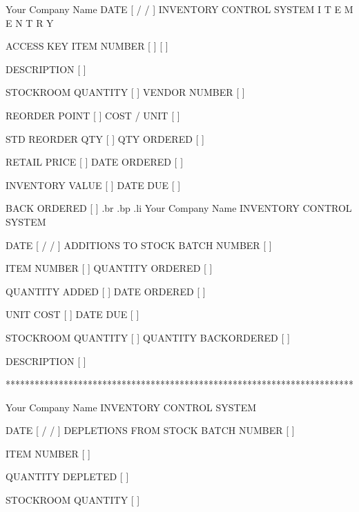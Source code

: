 			 Your Company Name
  DATE [  /  /	]      INVENTORY CONTROL SYSTEM
			 I T E M   E N T R Y

  ACCESS KEY					    ITEM NUMBER
[	    ]					    [	      ]

DESCRIPTION	  [				 ]

STOCKROOM QUANTITY [	   ]		VENDOR NUMBER [     ]

REORDER POINT	   [	   ]		COST / UNIT   [       ]

STD REORDER QTY    [	   ]		QTY ORDERED [	     ]

RETAIL PRICE	   [	       ]	DATE ORDERED  [        ]

INVENTORY VALUE    [		 ]	DATE DUE      [        ]

					BACK ORDERED  [       ]
.br
.bp
.li
			Your Company Name
		     INVENTORY CONTROL SYSTEM

DATE [	/  /  ]      ADDITIONS TO STOCK 	BATCH NUMBER [	    ]


ITEM NUMBER   [ 	 ]		 QUANTITY ORDERED  [	    ]

QUANTITY ADDED [       ]		 DATE ORDERED [        ]

UNIT COST      [	  ]		 DATE DUE     [        ]

STOCKROOM QUANTITY [	    ]		 QUANTITY BACKORDERED [        ]

	    DESCRIPTION [				 ]


************************************************************************


		       Your Company Name
		   INVENTORY CONTROL SYSTEM

DATE [	/  /  ]    DEPLETIONS FROM STOCK	   BATCH NUMBER  [     ]



		  ITEM NUMBER	 [	  ]

		  QUANTITY DEPLETED [	     ]

		  STOCKROOM QUANTITY [	      ]


